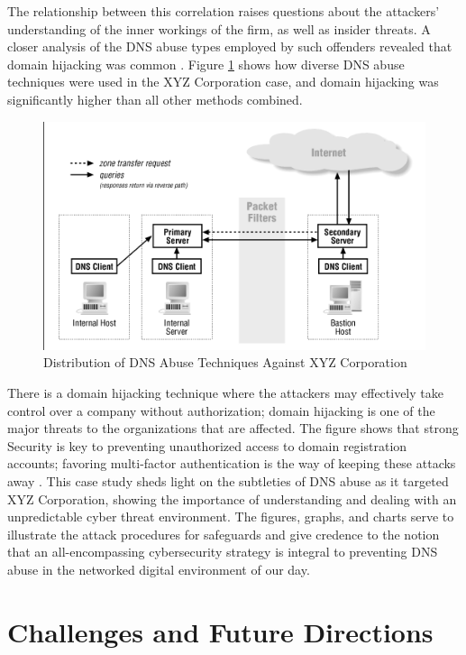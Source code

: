 The relationship between this correlation raises questions about the attackers' understanding of the inner workings of the firm, as well as insider threats. A closer analysis of the DNS abuse types employed by such offenders revealed that domain hijacking was common \cite{bayer2022study}. Figure \ref{fig:figureTwo} shows how diverse DNS abuse techniques were used in the XYZ Corporation case, and domain hijacking was significantly higher than all other methods combined.

\begin{figure}[ht]
\centering
\includegraphics{background/XYZ2.png}
\caption{Distribution of DNS Abuse Techniques Against XYZ Corporation}
\label{fig:figureTwo}
\end{figure}

There is a domain hijacking technique where the attackers may effectively take control over a company without authorization; domain hijacking is one of the major threats to the organizations that are affected. The figure shows that strong Security is key to preventing unauthorized access to domain registration accounts; favoring multi-factor authentication is the way of keeping these attacks away \cite{paz2020cyber}. This case study sheds light on the subtleties of DNS abuse as it targeted XYZ Corporation, showing the importance of understanding and dealing with an unpredictable cyber threat environment. The figures, graphs, and charts serve to illustrate the attack procedures for safeguards and give credence to the notion that an all-encompassing cybersecurity strategy is integral to preventing DNS abuse in the networked digital environment of our day.

\section{Challenges and Future Directions}

